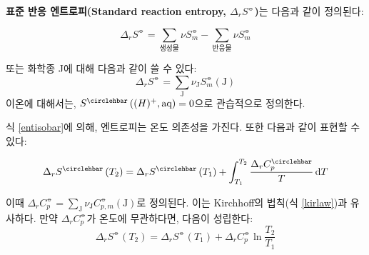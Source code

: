         \textbf{표준 반응 엔트로피(Standard reaction entropy, $\Delta_r S^{\circlehbar}$)}는 다음과 같이 정의된다:
        \begin{defn}[표준 반응 엔트로피]
        \begin{equation*}
            \Delta_r S^{\circlehbar} = \sum_{\textrm{생성물}} \nu S_m^{\circlehbar} - \sum_{\textrm{반응물}} \nu S_m^{\circlehbar}
        \end{equation*}
        \end{defn}
        또는 화학종 J에 대해 다음과 같이 쓸 수 있다:
        \begin{equation*}
            \Delta_r S^{\circlehbar} = \sum_{\mathrm{J}} \nu_{\mathrm{J}}S_m^{\circlehbar}\left(\mathrm{J}\right)
        \end{equation*}
        이온에 대해서는, $S^{\circlehbar}\left(\textrm(H)^{+},\textrm{aq}\right)=0$으로 관습적으로 정의한다.
        \par 식 \ref{entisobar}에 의해, 엔트로피는 온도 의존성을 가진다. 또한 다음과 같이 표현할 수 있다:
        \begin{cor}
        \begin{equation*}
            \Delta_r S^{\circlehbar}\left(T_2\right) = \Delta_r S^{\circlehbar}\left(T_1 \right)+\int_{T_1}^{T_2}\frac{\Delta_r C_p^{\circlehbar}}{T}\difform T
        \end{equation*}
        \end{cor}
        이때 $\displaystyle\Delta_r C_p^{\circlehbar} = \sum_{\mathrm{J}}\nu_\mathrm{J}C_{p,m}^{\circlehbar}\left(\mathrm{J}\right)$로 정의된다. 이는 Kirchhoff의 법칙(식 \ref{kirlaw})과 
        유사하다. 만약 $\Delta_r C_p^{\circlehbar}$가 온도에 무관하다면, 다음이 성립한다:
        \begin{equation*}
            \Delta_r S^{\circlehbar}\left(T_2\right) = \Delta_r S^{\circlehbar}\left(T_1\right) + \Delta_r C_p^{\circlehbar} \ln{\frac{T_2}{T_1}}
        \end{equation*}
